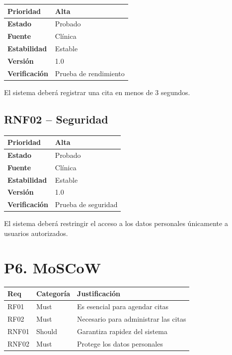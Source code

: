 \documentclass[11pt,a4paper,oneside]{article}
\begin{document}
\begin{tabular}{|p{}|p{}|}
\hline
\textbf{Prioridad} & Alta \\ \hline
\textbf{Estado} & Probado \\ \hline
\textbf{Fuente} & Clínica \\ \hline
\textbf{Estabilidad} & Estable \\ \hline
\textbf{Versión} & 1.0 \\ \hline
\textbf{Verificación} & Prueba de rendimiento \\ \hline
\end{tabular}

El sistema deberá registrar una cita en menos de 3 segundos.

\subsection*{RNF02 -- Seguridad}

\begin{tabular}{|p{}|p{}|}
\hline
\textbf{Prioridad} & Alta \\ \hline
\textbf{Estado} & Probado \\ \hline
\textbf{Fuente} & Clínica \\ \hline
\textbf{Estabilidad} & Estable \\ \hline
\textbf{Versión} & 1.0 \\ \hline
\textbf{Verificación} & Prueba de seguridad \\ \hline
\end{tabular}

El sistema deberá restringir el acceso a los datos personales únicamente a usuarios autorizados.

\section*{P6. MoSCoW}

\begin{tabular}{|p{}|p{}|p{}|}
\hline
\textbf{Req} & \textbf{Categoría} & \textbf{Justificación} \\ \hline
RF01 & Must & Es esencial para agendar citas \\ \hline
RF02 & Must & Necesario para administrar las citas \\ \hline
RNF01 & Should & Garantiza rapidez del sistema \\ \hline
RNF02 & Must & Protege los datos personales \\ \hline
\end{tabular}
\end{document}
